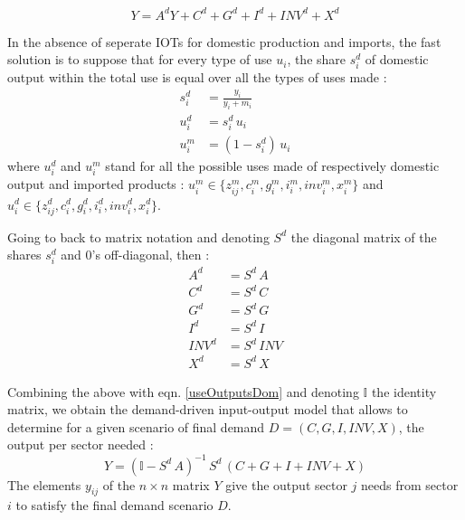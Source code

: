 \documentclass[12pt,english]{article}
\begin{document}
\begin{equation}
Y = A^d  Y + C^d + G^d + I^d + INV^d + X^d \label{useOutputsDom}
\end{equation}

In the absence of seperate IOTs for domestic production and imports, the fast solution is to suppose that for every type of use $u_i$, the share $s_{i}^d$ of domestic output within the total use is equal over all the types of uses made :
\begin{align}
s_i^d &= \frac{y_i}{y_i + m_i} \\
u_i^d &= s_i^d \, u_i \label{shareM} \\
u_i^m &= (1-s_i^d) \, u_i
\end{align}
where $u_i^d$ and $u_i^m$ stand for all the possible uses made of respectively domestic output and imported products : $u_i^m \in \{z_{ij}^m, c_i^m, g_i^m, i_i^m, inv_i^m, x_i^m\}$ and $u_i^d \in \{z_{ij}^d, c_i^d, g_i^d, i_i^d, inv_i^d, x_i^d\}$. %

Going to back to matrix notation and denoting $S^d$ the diagonal matrix of the shares $s_i^d$ and 0's off-diagonal, then %
:
\begin{align}
A^d &= S^d \, A \\
C^d &= S^d \, C \\
G^d &= S^d \, G \\
I^d &= S^d \, I \\
INV^d &= S^d \, INV \\
X^d &= S^d \, X 
\end{align}

Combining the above with eqn. \ref{useOutputsDom} and denoting $\mathbb{I}$ the identity matrix, we obtain the demand-driven input-output model that allows to determine for a given scenario of final demand $D = (C, G, I, INV, X )$, the output per sector needed :
\begin{equation}
Y = (\mathbb{I} - S^d \, A)^{-1} \,  S^d \, (C + G + I + INV + X)  \label{IOdemand-driven}
\end{equation}
The elements $y_{ij}$ of the $n \times n$ matrix $Y$ give the output sector $j$ needs from sector $i$ to satisfy the final demand scenario $D$.

\end{document}

